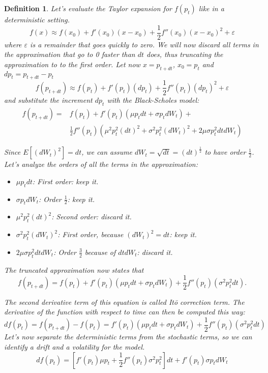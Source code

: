 \documentclass[oneside,titlepage,headinclude,12pt,a4paper,BCOR5mm,footinclude]{book}
\theoremstyle{defn}
\newtheorem{defn}{Definition}
\begin{document}
\begin{defn}
  Let's evaluate the \textit{Taylor expansion} for $f(p_t)$ like in a deterministic setting.
  \[
    f(x) \approx f(x_0) + f'(x_0)(x-x_0) + \frac{1}{2} f''(x_0)(x-x_0)^2 + \varepsilon
  \]
  where $\varepsilon$  is a  remainder that  goes quickly to  zero. We  will now
  discard all  terms in the  approximation that go to  0 faster than  $dt$ does,
  thus truncating the approximation to to the first order. Let now $x=p_{t+dt}$,
  $x_0 = p_t$ and $dp_t = p_{t+dt} - p_t$
  \[
    f(p_{t+dt}) \approx f(p_t) + f'(p_t)(dp_t) + \frac{1}{2} f''(p_t)(dp_t)^2 + \varepsilon
  \]
  and substitute the increment $dp_t$ with the Black-Scholes model:
  \begin{align*}
    f(p_{t+dt}) = & f(p_t) + f'(p_t)(\mu p_t dt + \sigma p_t dW_t) +\\ 
                  & \frac{1}{2}f''(p_t)(\mu^2 p_t^2 (dt)^2 + \sigma^2 p_t^2 (dW_t)^2 + 2 \mu \sigma p_t^2 dtdW_t) 
  \end{align*}

  Since $E[(dW_t)^2] = dt$, we can  assume $dW_t = \sqrt{dt} = (dt)^\frac{1}{2}$
  to have order $\frac{1}{2}$. Let's analyze the  orders of all the terms in the
  approximation:
  \begin{itemize}
    \item $\mu p_t dt$: First order: keep it.
    \item $\sigma p_t dW_t$: Order $\frac{1}{2}$: keep it.
    \item $\mu^2 p_t^2 (dt)^2$: Second order: discard it.
    \item $\sigma^2 p_t^2 (dW_t)^2$: First order, because $(dW_t)^2 = dt$: keep it.
    \item $2 \mu \sigma p_t^2 dtdW_t$: Order $\frac{3}{2}$ because of $dtdW_t$: discard it.
  \end{itemize}
  The truncated approximation now states that
  \[
    f(p_{t+dt}) = f(p_t) + f'(p_t)(\mu p_t dt + \sigma p_t dW_t) + 
    \frac{1}{2} f''(p_t)(\sigma^2 p_t^2 dt). 
  \]

  The second derivative term of this equation is called \textit{It\=o correction
  term}.  The derivative  of  the function  with  respect to  time  can then  be
  computed this way:
  \[
    df(p_t) = f(p_{t+dt}) - f(p_t) = f'(p_t)(\mu p_t dt + \sigma p_t dW_t) + 
    \frac{1}{2} f''(p_t)(\sigma^2 p_t^2 dt)
  \]
  Let's now  separate the deterministic terms  from the stochastic terms,  so we
  can identify a \textit{drift} and a \textit{volatility} for the model.
  \[
    df(p_t) = \left[ f'(p_t)\mu p_t + \frac{1}{2}f''(p_t)\sigma^2 p_t^2\right]dt
      + f'(p_t)\sigma p_t dW_t
  \]


\end{defn}
\end{document}
